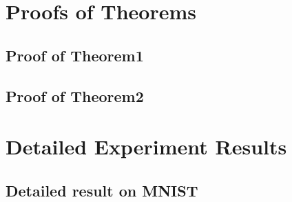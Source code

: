 \chapter{Proofs of Theorems}
\section{Proof of Theorem1}

\section{Proof of Theorem2}\label{app:cross}

%
%
\chapter{Detailed Experiment Results}
\section{Detailed result on MNIST}
